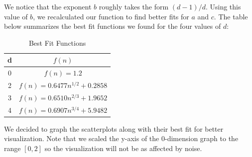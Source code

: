 \documentclass[12pt]{article}
\begin{document}
\pagebreak

We notice that the exponent $b$ roughly takes the form $(d-1)/d$. Using this value of $b$, we recalculated our function to find better fits for $a$ and $c$. The table below summarizes the best fit functions we found for the four values of $d$:

\begin{table}[h!]
\centering
\caption{Best Fit Functions}
\renewcommand{\arraystretch}{1.3}
{\setlength{\tabcolsep}{15pt}
\begin{tabular} {c | c  }
d&$f(n)$\\ \hline
0&$f(n) = 1.2$\\
2&$f(n) = 0.6477n^{1/2} + 0.2858$\\
3&$f(n) = 0.6510n^{2/3}+1.9652$\\
4&$f(n) = 0.6907n^{3/4}+5.9482$\\
\end{tabular}}
\label{table:4}
\end{table}

We decided to graph the scatterplots along with their best fit for better visualization. Note that we scaled the y-axis of the 0-dimension graph to the range $[0, 2]$ so the visualization will not be as affected by noise. \\
\end{document}
